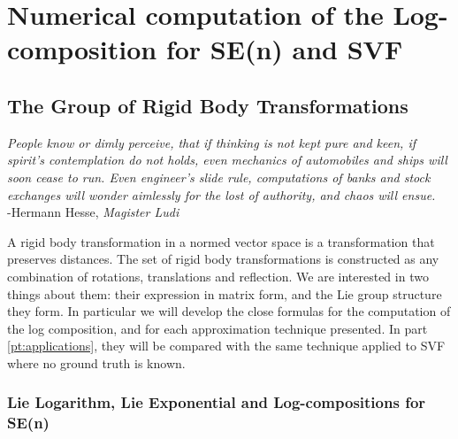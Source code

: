 \chapter{Numerical computation of the Log-composition for SE(n) and SVF}\label{ch:spatial_transformations}

\section{The Group of Rigid Body Transformations}\label{ch:rigid_body_transformations}

\begin{flushright}
	\emph{People know or dimly perceive, that if thinking is not kept pure and keen, if spirit's contemplation do not holds, even mechanics of automobiles and ships will soon cease to run. Even engineer's slide rule, computations of banks and stock exchanges will wonder aimlessly for the lost of authority, and chaos will ensue.} \\ -Hermann Hesse, \emph{Magister Ludi}
\end{flushright}


A rigid body transformation in a normed vector space is a transformation that preserves distances. The set of rigid body transformations is constructed as any combination of rotations, translations and reflection. We are interested in two things about them: their expression in matrix form, and the Lie group structure they form. In particular we will develop the close formulas for the computation of the log composition, and for each approximation technique presented. In part \ref{pt:applications}, they will be compared with the same technique applied to SVF where no ground truth is known.

\subsection{Lie Logarithm, Lie Exponential and Log-compositions for SE(n)}

